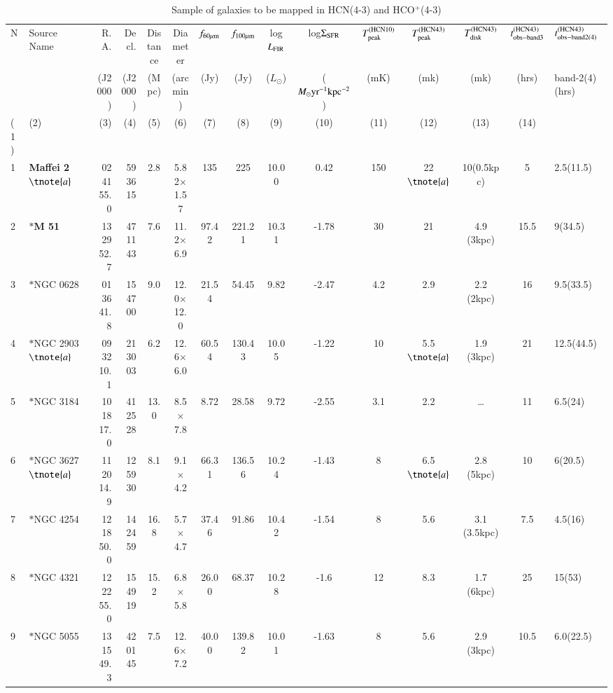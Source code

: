 \documentclass[legal,11pt]{article}
\begin{document}
\begin{table}
\caption{Sample of galaxies to be mapped in HCN(4-3) and HCO$^+$(4-3)}
\label{tbl:sample}
\centering
\scriptsize
\addtolength{\tabcolsep}{-4.5pt}

\begin{threeparttable}[b]
\begin{tabular}{llrrccccccccccl}
\hline
\hline

N & Source Name & R.A. & Decl. & Distance & Diameter & $f_{\rm 60\mu m}$ & $f_{\rm 100\mu m}$ & log$L_{\rm FIR}$ & log$\Sigma_{\rm SFR}$ & $T_{\rm peak}^{\rm (HCN10)}$ & $T_{\rm peak}^{\rm (HCN43)}$ & $T_{\rm disk}^{\rm (HCN43)}$  & $t_{\rm obs-band3}^{\rm (HCN43)}$ & $t_{\rm obs-band2(4)}^{\rm (HCN43)}$ \\

  &  & (J2000) & (J2000) & (Mpc) & (arcmin) & (Jy) & (Jy) & ($L_\odot$) & ($M_{\odot} \rm yr^{-1} kpc^{-2}$) & (mK) & (mk) & (mk) & (hrs) & band-2(4)(hrs) \\

(1) & (2)  & (3) & (4) & (5) & (6) & (7) & (8) & (9) & (10) & (11) & (12) & (13) & (14)  \\

\hline

1 & {\bf Maffei 2}$\tnote{a}$ & 02 41 55.0 & 59 36 15 & 2.8 & 5.82$\times$1.57 & 135 & 225 & 10.00 & 0.42 & 150 & 22$\tnote{a}$ & 10(0.5kpc) & 5 & 2.5(11.5) \\  
2 & $\ast${\bf M 51} & 13 29 52.7 & 47 11 43 & 7.6 & 11.2$\times$6.9 & 97.42 & 221.21 & 10.31 & -1.78 & 30 & 21 & 4.9 (3kpc) & 15.5 & 9(34.5) \\
3 & $\ast$NGC 0628 & 01 36 41.8 & 15 47 00 & 9.0 & 12.0$\times$12.0 & 21.54 & 54.45 & 9.82 & -2.47 & 4.2 & 2.9 & 2.2 (2kpc) & 16 & 9.5(33.5)\\
4 & $\ast$NGC 2903$\tnote{a}$ & 09 32 10.1 & 21 30 03 & 6.2 & 12.6$\times$6.0 & 60.54 & 130.43 & 10.05 & -1.22 & 10 & 5.5$\tnote{a}$ & 1.9 (3kpc) & 21 & 12.5(44.5) \\
5 & $\ast$NGC 3184 & 10 18 17.0 & 41 25 28 & 13.0 & 8.5$\times$7.8 & 8.72 & 28.58 & 9.72 & -2.55 & 3.1 & 2.2 & \dots & 11 & 6.5(24) \\
6 & $\ast$NGC 3627$\tnote{a}$ & 11 20 14.9 & 12 59 30 & 8.1 & 9.1$\times$4.2 & 66.31 & 136.56 & 10.24 & -1.43 & 8 & 6.5$\tnote{a}$ & 2.8 (5kpc) & 10 & 6(20.5) \\
7 & $\ast$NGC 4254 & 12 18 50.0 & 14 24 59 &  16.8 & 5.7$\times$4.7 & 37.46 & 91.86 & 10.42 & -1.54 & 8 & 5.6 & 3.1 (3.5kpc) & 7.5 & 4.5(16) \\
8 & $\ast$NGC 4321 & 12 22 55.0 & 15 49 19 &  15.2 & 6.8$\times$5.8 & 26.00 & 68.37 & 10.28 & -1.6 & 12 & 8.3 & 1.7 (6kpc) & 25 & 15(53)\\ 
9 & $\ast$NGC 5055 & 13 15 49.3 & 42 01 45 & 7.5 & 12.6$\times$7.2 & 40.00 & 139.82 & 10.01 & -1.63 & 8 & 5.6 & 2.9 (3kpc) & 10.5 & 6.0(22.5) \\


\end{tabular}
\end{threeparttable}
\end{table}
\end{document}
